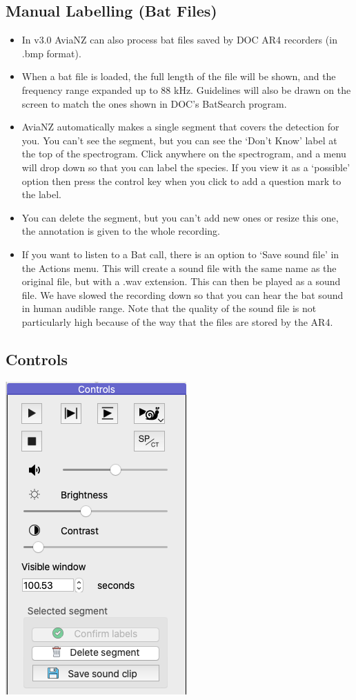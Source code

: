 \documentclass{article}
\begin{document}
\subsection{Manual Labelling (Bat Files) \label{sec:bats}}

\begin{itemize}
\item In v3.0 AviaNZ can also process bat files saved by DOC AR4 recorders (in .bmp format). 
\item When a bat file is loaded, the full length of the file will be shown, and the frequency range expanded up to 88 kHz. Guidelines will also be drawn on the screen to match the ones shown in DOC's BatSearch program. 
\item AviaNZ automatically makes a single segment that covers the detection for you. You can't see the segment, but you can see the `Don't Know' label at the top of the spectrogram. Click anywhere on the spectrogram, and a menu will drop down so that you can label the species. If you view it as a `possible' option then press the control key when you click to add a question mark to the label.
\item You can delete the segment, but you can't add new ones or resize this one, the annotation is given to the whole recording.
\item If you want to listen to a Bat call, there is an option to `Save sound file' in the Actions menu. This will create a sound file with the same name as the original file, but with a .wav extension. This can then be played as a sound file. We have slowed the recording down so that you can hear the bat sound in human audible range. Note that the quality of the sound file is not particularly high because of the way that the files are stored by the AR4. 
\end{itemize}

\subsection{Controls \label{sec:play}}

\begin{center}
\includegraphics[width=.25\textwidth]{Figures/Controls.png}
\end{center}
\end{document}
